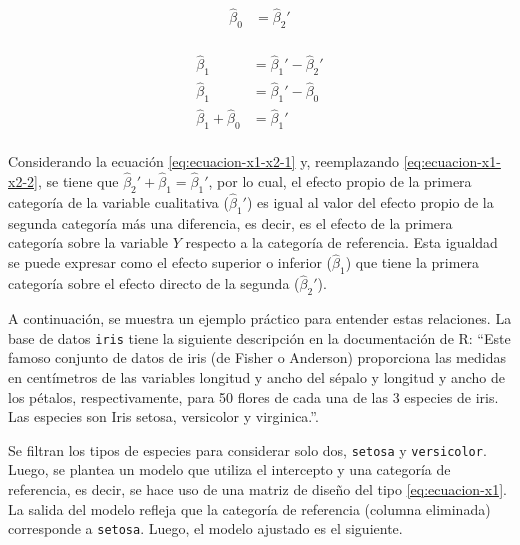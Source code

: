 \documentclass[
  11pt,
]{book}
\theoremstyle{definition}
\theoremstyle{definition}
\theoremstyle{definition}
\theoremstyle{definition}
\theoremstyle{remark}
\begin{document}
\begin{equation}
\begin{split}
\widehat{\beta}_0 &= \widehat{\beta}_2'\\
\end{split}
\label{eq:ecuacion-x1-x2-1}
\end{equation}

\begin{equation}
\begin{split}
\widehat{\beta}_1 &= \widehat{\beta}_1' - \widehat{\beta}_2'\\
\widehat{\beta}_1 &= \widehat{\beta}_1' - \widehat{\beta}_0\\
\widehat{\beta}_1 + \widehat{\beta}_0 &= \widehat{\beta}_1'\\
\end{split}
\label{eq:ecuacion-x1-x2-2}
\end{equation}

Considerando la ecuación \eqref{eq:ecuacion-x1-x2-1} y, reemplazando \eqref{eq:ecuacion-x1-x2-2}, se tiene que \(\widehat{\beta}_2' + \widehat{\beta}_1 = \widehat{\beta}_1'\), por lo cual, el efecto propio de la primera categoría de la variable cualitativa (\(\widehat{\beta}_1'\)) es igual al valor del efecto propio de la segunda categoría más una diferencia, es decir, es el efecto de la primera categoría sobre la variable \(Y\) respecto a la categoría de referencia. Esta igualdad se puede expresar como el efecto superior o inferior (\(\widehat{\beta}_1\)) que tiene la primera categoría sobre el efecto directo de la segunda (\(\widehat{\beta}_2'\)).

A continuación, se muestra un ejemplo práctico para entender estas relaciones. La base de datos \texttt{iris} tiene la siguiente descripción en la documentación de R: ``Este famoso conjunto de datos de iris (de Fisher o Anderson) proporciona las medidas en centímetros de las variables longitud y ancho del sépalo y longitud y ancho de los pétalos, respectivamente, para 50 flores de cada una de las 3 especies de iris. Las especies son Iris setosa, versicolor y virginica.''.

Se filtran los tipos de especies para considerar solo dos, \texttt{setosa} y \texttt{versicolor}. Luego, se plantea un modelo que utiliza el intercepto y una categoría de referencia, es decir, se hace uso de una matriz de diseño del tipo \eqref{eq:ecuacion-x1}. La salida del modelo refleja que la categoría de referencia (columna eliminada) corresponde a \texttt{setosa}. Luego, el modelo ajustado es el siguiente.
\end{document}
